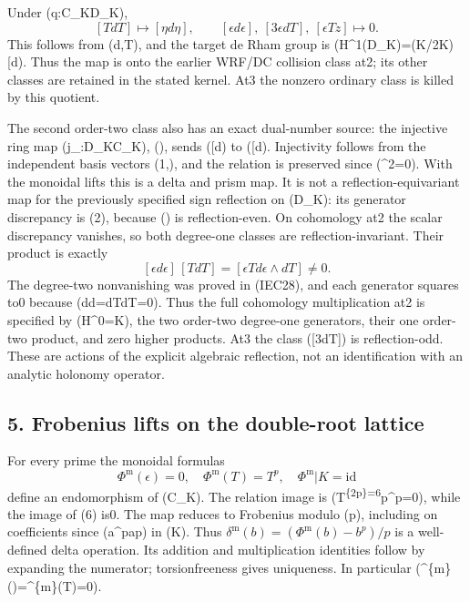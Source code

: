 \documentclass[
]{article}
\begin{document}
Under (q:C\_K\to D\_K), \[
[T dT]\longmapsto[\eta d\eta],\qquad
[\epsilon d\epsilon],\ [3\epsilon dT],\ [\epsilon Tz]\longmapsto0.
\tag{IEC29}
\] This follows from (d\epsilon{},T\mapsto\eta), and the target de
Rham group is (H\^{}1(D\_K)=(K/2K){[}\eta d\eta{]}). Thus the map is
onto the earlier WRF/DC collision class at2; its other classes are
retained in the stated kernel. At3 the nonzero ordinary class is killed
by this quotient.

The second order-two class also has an exact dual-number source: the
injective ring map (j\_\epsilon:D\_K\to C\_K), (\eta\mapsto\epsilon),
sends ({[}\eta d\eta{]}) to ({[}\epsilon d\epsilon{]}). Injectivity
follows from the independent basis vectors (1,\epsilon), and the
relation is preserved since (\epsilon\^{}2=0). With the monoidal lifts
this is a delta and prism map. It is not a reflection-equivariant map
for the previously specified sign reflection on (D\_K): its generator
discrepancy is (2\epsilon), because (\epsilon) is reflection-even. On
cohomology at2 the scalar discrepancy vanishes, so both degree-one
classes are reflection-invariant. Their product is exactly \[
[\epsilon d\epsilon]\,[TdT]=[\epsilon T d\epsilon\wedge dT]\ne0.
\tag{IEC60}
\] The degree-two nonvanishing was proved in (IEC28), and each generator
squares to0 because (d\epsilon\wedge d\epsilon=dT\wedge dT=0). Thus the
full cohomology multiplication at2 is specified by (H\^{}0=K), the two
order-two degree-one generators, their one order-two product, and zero
higher products. At3 the class ({[}3\epsilon dT{]}) is reflection-odd.
These are actions of the explicit algebraic reflection, not an
identification with an analytic holonomy operator.

\subsection{5. Frobenius lifts on the double-root
lattice}\label{frobenius-lifts-on-the-double-root-lattice}

For every prime the monoidal formulas \[
\Phi^{\mathrm m}(\epsilon)=0,\quad \Phi^{\mathrm m}(T)=T^p,
\quad\Phi^{\mathrm m}|K=\mathrm{id}
\tag{IEC30}
\] define an endomorphism of (C\_K). The relation image is
(T\textsuperscript{\{2p\}=6}p\epsilon\^{}p=0), while the image of
(6\epsilon) is0. The map reduces to Frobenius modulo (p), including on
coefficients since (a\^{}p\equiv a\pmod p) in (K). Thus
\(\delta^{\mathrm m}(b)=(\Phi^{\mathrm m}(b)-b^p)/p\) is a well-defined
delta operation. Its addition and multiplication identities follow by
expanding the numerator; torsionfreeness gives uniqueness. In particular
(\delta\^{}\{\mathrm m\}(\epsilon)=\delta\^{}\{\mathrm m\}(T)=0).
\end{document}
